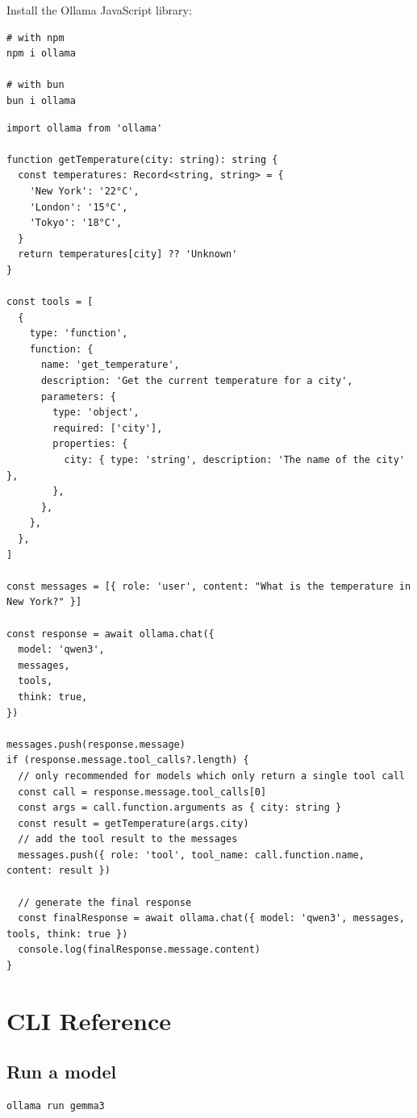 \documentclass[12pt,UTF8]{ctexbook}
\begin{document}
Install the Ollama JavaScript library:

\begin{verbatim}
# with npm
npm i ollama

# with bun
bun i ollama
\end{verbatim}

\begin{verbatim}
import ollama from 'ollama'

function getTemperature(city: string): string {
  const temperatures: Record<string, string> = {
    'New York': '22°C',
    'London': '15°C',
    'Tokyo': '18°C',
  }
  return temperatures[city] ?? 'Unknown'
}

const tools = [
  {
    type: 'function',
    function: {
      name: 'get_temperature',
      description: 'Get the current temperature for a city',
      parameters: {
        type: 'object',
        required: ['city'],
        properties: {
          city: { type: 'string', description: 'The name of the city' },
        },
      },
    },
  },
]

const messages = [{ role: 'user', content: "What is the temperature in New York?" }]

const response = await ollama.chat({
  model: 'qwen3',
  messages,
  tools,
  think: true,
})

messages.push(response.message)
if (response.message.tool_calls?.length) {
  // only recommended for models which only return a single tool call
  const call = response.message.tool_calls[0]
  const args = call.function.arguments as { city: string }
  const result = getTemperature(args.city)
  // add the tool result to the messages
  messages.push({ role: 'tool', tool_name: call.function.name, content: result })

  // generate the final response
  const finalResponse = await ollama.chat({ model: 'qwen3', messages, tools, think: true })
  console.log(finalResponse.message.content)
}
\end{verbatim}

\section{CLI Reference}

\subsection{Run a model}
\begin{verbatim}
ollama run gemma3
\end{verbatim}
\end{document}
